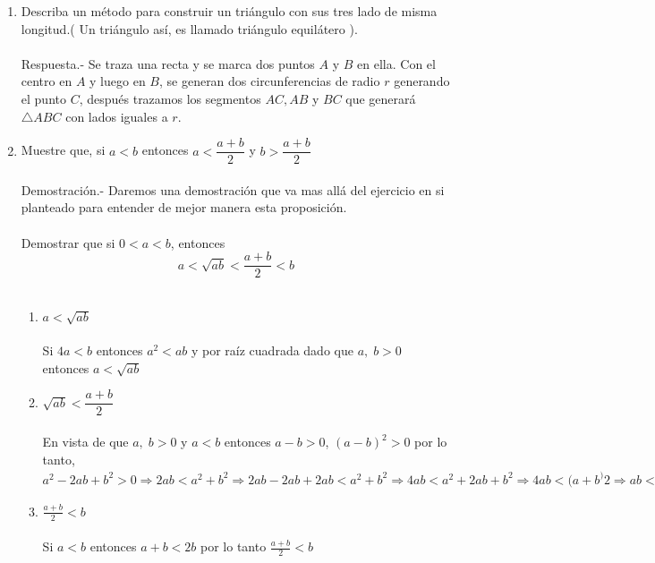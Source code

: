 \begin{enumerate}
\begin{center}
\begin{tikzpicture}
	\end{tikzpicture}
    \end{center}

    \item Describa un método para construir un triángulo con sus tres lado de misma longitud.( Un triángulo así, es llamado triángulo equilátero ).\\\\
    Respuesta.-\; Se traza una recta y se marca dos puntos $A$ y $B$ en ella. Con el centro en $A$ y luego en $B$, se generan dos circunferencias de radio $r$ generando el punto $C$, después trazamos los segmentos $AC, AB$ y $BC$ que generará $\triangle ABC$ con lados iguales a $r$.
    \begin{center}
    \end{center}

    \item Muestre que, si $a<b$ entonces $a<\dfrac{a+b}{2}$ y $b>\dfrac{a+b}{2}$\\\\
    Demostración.-\; Daremos una demostración que va mas allá del ejercicio en si planteado para entender de mejor manera esta proposición.\\\\
    Demostrar que si $0<a < b$, entonces $$a<\sqrt{ab}<\dfrac{a+b}{2} < b$$\\
    \begin{enumerate}[1.]
	\item $a<\sqrt{ab}$\\\\
Si \; $4a<b$ entonces $a^2<ab$ y por raíz cuadrada dado que $a,\;b>0$ entonces $a<\sqrt{ab}$\\
	\item $\sqrt{ab}<\dfrac{a+b}{2}$\\\\
En vista de que $a, \; b > 0$ y $a<b$ entonces $a-b>0$, \; $(a-b)^2>0$ por lo tanto, $a^2-2ab+b^2>0 \Rightarrow 2ab< a^2+b^2 \Rightarrow 2ab-2ab+2ab<a^2+b^2 \Rightarrow 4ab < a^2+2ab +b^2 \Rightarrow 4ab < (a+b^)2 \Rightarrow ab < \displaystyle \left( \frac{a+b}{2} \right) ^2 \Rightarrow \sqrt{ab}<\frac{a+b}{2} $ \\
	\item $\displaystyle\frac{a+b}{2}<b$\\\\
Si $a<b$ entonces $a+b<2b$ por lo tanto $\displaystyle\frac{a+b}{2}<b$\\\\
    \end{enumerate}


\end{enumerate}
